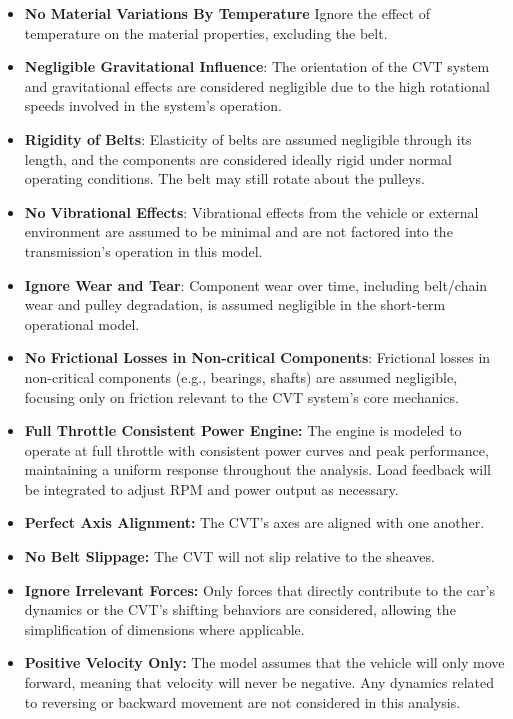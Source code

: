 \documentclass[12pt]{article}
\begin{document}
\begin{itemize}

\item[A:NT \label{A:NT}:]
\textbf{No Material Variations By Temperature } Ignore the effect of temperature on the material properties, excluding the belt.

\item[A:NG \label{A:NG}:]
\textbf{Negligible Gravitational Influence}: The orientation of the CVT system and gravitational effects are considered negligible due to the high rotational speeds involved in the system's operation.

\item[A:RB \label{A:RB}:]
\textbf{Rigidity of Belts}: Elasticity of belts are assumed negligible through its length, and the components are considered ideally rigid under normal operating conditions. The belt may still rotate about the pulleys.

\item[A:NV \label{A:NV}:]
\textbf{No Vibrational Effects}: Vibrational effects from the vehicle or external environment are assumed to be minimal and are not factored into the transmission’s operation in this model.

\item[A:WT \label{A:WT}:]
\textbf{Ignore Wear and Tear}: Component wear over time, including belt/chain wear and pulley degradation, is assumed negligible in the short-term operational model.

\item[A:NF \label{A:NF}:]
\textbf{No Frictional Losses in Non-critical Components}: Frictional losses in non-critical components (e.g., bearings, shafts) are assumed negligible, focusing only on friction relevant to the CVT system's core mechanics.

\item[A:FT \label{A:FT}:]
\textbf{Full Throttle Consistent Power Engine:} The engine is modeled to operate at full throttle with consistent power curves and peak performance, maintaining a uniform response throughout the analysis. Load feedback will be integrated to adjust RPM and power output as necessary.

\item[A:AA \label{A:AA}:]
\textbf{Perfect Axis Alignment:} The CVT's axes are aligned with one another.

\item[A:NS \label{A:NS}:]
\textbf{No Belt Slippage:} The CVT will not slip relative to the sheaves.

\item[A:IF \label{A:IF}:]
\textbf{Ignore Irrelevant Forces:} Only forces that directly contribute to the car's dynamics or the CVT's shifting behaviors are considered, allowing the simplification of dimensions where applicable.

\item[A:PV \label{A:PV}:]
\textbf{Positive Velocity Only:} The model assumes that the vehicle will only move forward, meaning that velocity will never be negative. Any dynamics related to reversing or backward movement are not considered in this analysis.


\end{itemize}
\end{document}
